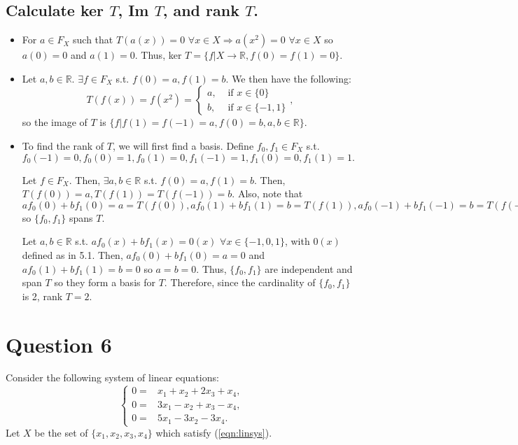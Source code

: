 \documentclass[11pt]{article} %
\begin{document}
\subsection{Calculate ker $T$, Im $T$, and rank $T$.}
\begin{itemize}
\item
For $a \in F_X$ such that $T(a(x)) = 0$ $\forall x \in X \Rightarrow a(x^2) = 0$ $\forall x \in X$ so  $a(0) = 0$ and $a(1) = 0.$ Thus, ker $ T = \{f|X \rightarrow \mathbb{R}, f(0) = f(1) = 0\}$.
\item
Let $a,b \in \mathbb{R}.$ $\exists f \in F_X$ s.t. $f(0) = a, f(1) = b$. We then have the following:
\begin{equation*}
T(f(x)) = f(x^2) = 
\begin{cases}
a,& \text{ if } x \in \{ 0\} \\
b,& \text{ if } x \in \{ -1,1\}
\end{cases},
\end{equation*} 
so the image of $T$ is $\{ f| f(1) = f(-1) = a, f(0) = b, a,b \in \mathbb{R}\}$.
\item
To find the rank of $T$, we will first find a basis. Define $f_0,f_1 \in F_X$ s.t. $f_0(-1) = 0, f_0(0) = 1, f_0(1) = 0,f_1(-1) = 1, f_1(0) = 0, f_1(1) = 1.$

Let $f \in F_X.$ Then, $\exists a,b \in \mathbb{R}$ s.t. $f(0) = a,f(1) = b.$ Then, $T(f(0)) = a, T(f(1)) = T(f(-1)) = b.$ Also, note that $af_0(0) +bf_1(0) = a = T(f(0)), af_0(1) +bf_1(1) = b = T(f(1)), af_0(-1) + bf_1(-1) = b = T(f(-1)) $ so $\{ f_0,f_1\}$ spans $T.$ 

Let $a,b \in \mathbb{R}$ s.t. $af_0(x) + bf_1(x) = 0(x)$ $\forall x \in \{-1,0,1\}$, with $0(x)$ defined as in 5.1. Then, $af_0(0) + bf_1(0) = a = 0$ and $af_0(1) + bf_1(1) = b = 0$ so $a=b=0.$ Thus, $\{ f_0,f_1\}$ are independent and span $T$ so they form a basis for $T$. Therefore, since the cardinality of $\{ f_0,f_1\}$ is 2, rank $T = 2.$
 
\end{itemize}
\section{Question 6}
Consider the following system of linear equations:
\begin{equation}
\begin{cases}
0=& x_1 + x_2 + 2x_3 + x_4, \\
0=&3x_1 - x_2 + x_3 - x_4, \\
0=&5x_1 - 3x_2 - 3x_4. \label{eqn:linsys}
\end{cases}
\end{equation}
Let $X$ be the set of $\{ x_1,x_2,x_3,x_4 \}$ which satisfy (\ref{eqn:linsys}).
\end{document}
